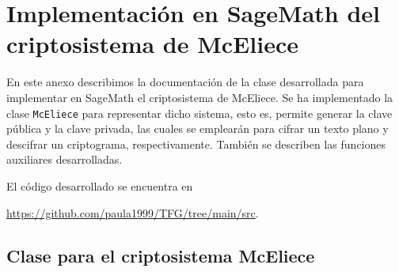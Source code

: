\chapter[Implementación en SageMath del criptosistema de McEliece]{Implementación en SageMath del criptosistema de McEliece}
\label{annex:sage-McEliece}

En este anexo describimos la documentación de la clase desarrollada para implementar en SageMath el criptosistema de McEliece. Se ha implementado la clase \texttt{McEliece} para representar dicho sistema, esto es, permite generar la clave pública y la clave privada, las cuales se emplearán para cifrar un texto plano y descifrar un criptograma, respectivamente. También se describen las funciones auxiliares desarrolladas. 

El código desarrollado se encuentra en
\begin{center}
\url{https://github.com/paula1999/TFG/tree/main/src}.
\end{center}

\section{Clase para el criptosistema McEliece}

